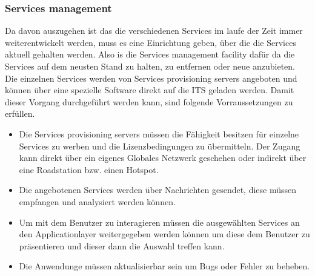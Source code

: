 \subsubsection{Services management \label{facilitylayer_ServicesManagement} }
Da davon auszugehen ist das die verschiedenen Services im laufe der Zeit immer weiterentwickelt werden, muss es eine Einrichtung geben, über die die Services aktuell gehalten werden. 
Also is die Services management facility dafür da die Services auf dem neusten Stand zu halten, zu entfernen oder neue anzubieten. Die einzelnen Services werden von Services provisioning servers angeboten und können über eine spezielle Software direkt auf die ITS geladen werden. Damit dieser Vorgang durchgeführt werden kann, sind folgende Vorraussetzungen zu erfüllen.
\begin{itemize}
\item Die Services provisioning servers müssen die Fähigkeit besitzen für einzelne Services zu werben und die Lizenzbedingungen zu übermitteln. Der Zugang kann direkt über ein eigenes Globales Netzwerk geschehen oder indirekt über eine Roadstation bzw. einen Hotspot.
\item Die angebotenen Services werden über Nachrichten gesendet, diese müssen empfangen und analysiert werden können.
\item Um mit dem Benutzer zu interagieren müssen die ausgewählten Services an den Applicationlayer weitergegeben werden können um diese dem Benutzer zu präsentieren und dieser dann die Auswahl treffen kann.
\item Die Anwendunge müssen aktualisierbar sein um Bugs oder Fehler zu beheben.  
\end{itemize}

